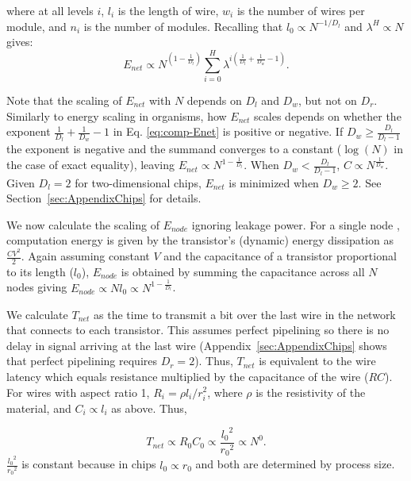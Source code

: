 \documentclass[12pt]{article}
\begin{document}
\noindent where at all levels $i$, $l_i$ is the length of wire, $w_i$ is the number of wires per
module, and $n_i$ is the number of modules. Recalling that
$l_0 \propto N^{-1/D_l}$ and $\lambda^H \propto N$ gives: 
\begin{equation}
\label{eq:comp-Enet}
  E_{net}  \propto  N^{(1- \frac{1}{D_l})} \sum_{i=0}^H \lambda^{i \left( 
\frac{1}{D_l} + \frac{1}{D_w} -1 \right)} .
\end{equation}

\noindent Note that the scaling of $E_{net} $ with $N$ depends on $D_l$ and
$D_w$, but not on $D_r$. Similarly to energy scaling in
organisms, how $E_{net}$ scales depends on whether the exponent
$\frac{1}{D_l} + \frac{1}{D_w}-1$ in Eq. \ref {eq:comp-Enet} is positive or
negative.  If $D_w \geq \frac{D_l}{D_l -1}$ the exponent is negative and the
summand converges to a constant ($\log(N)$ in the case of exact equality),
leaving $E_{net} \propto N^{1-\frac{1}{D_l}}$. When $D_w < \frac{D_l}{D_l -1}$,
$C \propto N^{\frac{1}{D_w}}$. Given $D_l = 2$ for two-dimensional chips, $E_{net}$
is minimized when $D_w \geq 2$. See Section~\ref{sec:AppendixChips} for
details.

We now calculate the scaling of $E_{node}$ ignoring leakage power. 
For a single node , computation
energy is given by the transistor's (dynamic) energy dissipation as
$\frac{CV^2}{2}$. Again assuming constant $V$ and the capacitance of a
transistor proportional to its length ($l_0$), $E_{node}$ is obtained
by summing
the capacitance across all $N$ nodes giving $E_{node} \propto N l_0  \propto
N^{1-\frac{1}{D_l}}$. 

We calculate $T_{net}$ as the time to transmit a bit over the last 
wire
in the network that connects to each transistor. This assumes perfect
pipelining so there is no delay in signal arriving at the last wire
(Appendix~\ref{sec:AppendixChips} shows that perfect pipelining requires $D_r =
2$). Thus, $T_{net}$ is equivalent to the wire latency which equals resistance
multiplied by the capacitance of the wire ($RC$). For wires with aspect ratio
1, $R_i = \rho l_i /r_i^2$, where $\rho$ is the resistivity of the material,
and $C_i \propto l_i$ as above.  Thus, 

\begin{equation}
\label{eq:comp-Tnet}
T_{net} \propto R_0C_0 \propto
\frac{{l_0}^2}{{r_0}^2} \propto N^0 .
\end {equation}
\noindent $ \frac{{l_0}^2}{{r_0}^2}$ is constant
because in chips  $l_0 \propto r_0$ and both are determined by process size.
\end{document}
